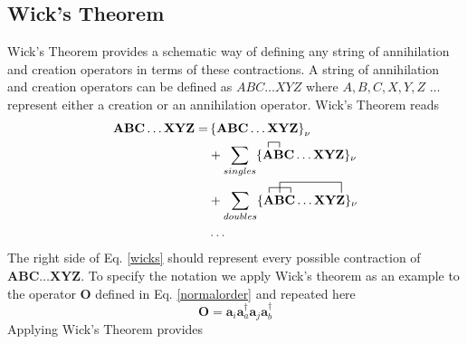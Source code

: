\documentclass[a4paper,norsk,11pt,twoside]{report}
\begin{document}
\subsection{Wick's Theorem}
Wick's Theorem provides a schematic way of defining any string of
annihilation and creation operators in terms of these contractions. A
string of annihilation and creation operators can be defined as $ABC
\dots XYZ$ where $A, B, C, X, Y, Z$ $\dots$ represent either a
creation or an annihilation operator.  Wick's Theorem reads
\begin{align}
\textbf{A} \textbf{B} \textbf{C} \dots \textbf{X} \textbf{Y} \textbf{Z} = & \left\{\textbf{A} \textbf{B} \textbf{C} \dots \textbf{X} \textbf{Y} \textbf{Z} \right\}_{\nu} \label{wicks} \\
& + \sum_{singles} \{
\contraction{}{\textbf{A}}{}{\textbf{B}}
\textbf{A}\textbf{B}
\textbf{C} \dots \textbf{X} \textbf{Y} \textbf{Z}
\}_{\nu} \nonumber \\
& + \sum_{doubles} \{
\contraction{}{\textbf{A}}{\textbf{B}}{\textbf{C}}
\contraction[2ex]{\textbf{A}}{\textbf{B}}{\textbf{C} \dots \textbf{X} \textbf{Y}}{\textbf{Z}}
\textbf{A} \textbf{B} \textbf{C} \dots \textbf{X} \textbf{Y} \textbf{Z} 
\}_{\nu} \nonumber \\
& \dots \nonumber
\end{align}
The right side of Eq. \eqref{wicks} should represent every possible
contraction of $\textbf{A} \textbf{B} \textbf{C} \dots \textbf{X}
\textbf{Y} \textbf{Z}$. To specify the notation we apply Wick's
theorem as an example to the operator $\textbf{O}$ defined in
Eq. \eqref{normalorder} and repeated here
\begin{equation}
\textbf{O} = \textbf{a}_i \textbf{a}^{\dag}_a \textbf{a}_j \textbf{a}^{\dag}_b \nonumber
\end{equation}
Applying Wick's Theorem provides
\end{document}
